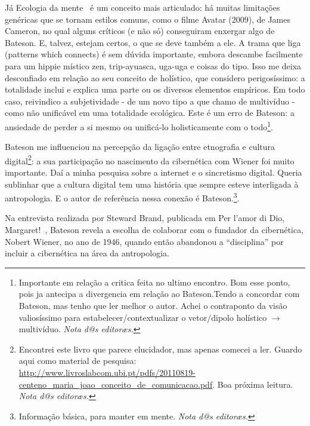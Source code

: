 \documentclass[a4paper, 11pt]{article} %
\makeatletter
\newcommand{\ftnt}[1]{\footnote{#1 \emph{Nota d@s editoræs.}}}
\makeatother
\begin{document}
Já Ecologia da mente~\cite{b5} é um conceito mais articulado: há muitas limitações genéricas que se tornam estilos comuns, como o filme Avatar (2009), de James Cameron, no qual alguns críticos (e não só) conseguiram enxergar algo de Bateson. E, talvez, estejam certos, o que se deve também a ele. A trama que liga (patterns which connects) é sem dúvida importante, embora descambe facilmente para um hippie místico zen, trip-ayuasca, uga-uga e coisas do tipo. Isso me deixa desconfiado em relação ao seu conceito de holístico, que considero perigosíssimo: a totalidade inclui e explica uma parte ou os diversos elementos empíricos. Em todo caso, reivindico a subjetividade - de um novo tipo a que chamo de multivíduo -  como não unificável em uma totalidade ecológica. Este é um erro de Bateson: a ansiedade de perder a si mesmo ou unificá-lo holisticamente com o todo\ftnt{Importante em relação a critica feita no ultimo encontro. Bom esse ponto, pois ja antecipa a divergencia em relação ao Bateson.Tendo a concordar com Bateson, mas tenho que ler melhor o autor. Achei o contraponto da visão valiosíssimo para estabelecer/contextualizar o vetor/dipolo holístico $\rightarrow$ multivíduo.}.

Bateson me influenciou na percepção da ligação entre etnografia e cultura digital\ftnt{Encontrei este livro que parece elucidador, mas apenas comecei a ler. Guardo aqui como material de pesquisa: 
\url{http://www.livroslabcom.ubi.pt/pdfs/20110819-centeno_maria_joao_conceito_de_comunicacao.pdf}. Boa próxima leitura.}: a sua participação no nascimento da cibernética com Wiener foi muito importante. Daí a minha pesquisa sobre a internet e o sincretismo digital. Queria sublinhar que a cultura digital tem uma história que sempre esteve interligada à antropologia. E o autor de referência nessa conexão é Bateson.\ftnt{Informação básica, para manter em mente.}.

Na entrevista realizada por Steward Brand, publicada em Per l’amor di Dio, Margaret!~\cite{b6}, Bateson revela a escolha de colaborar com o fundador da cibernética, Nobert Wiener, no ano de 1946, quando então abandonou a “disciplina” por incluir a cibernética na área da antropologia. 
\end{document}
